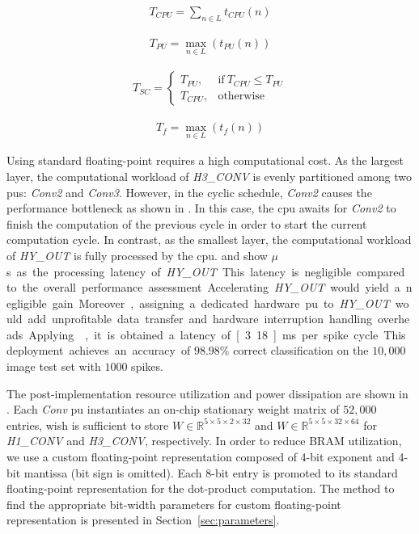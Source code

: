 \begin{eqnarray} \label{eq:time_cpu}
T_{CPU} = \sum_{n\in L} t_{CPU}(n)
\end{eqnarray}

\begin{eqnarray} \label{eq:time_pu}
T_{PU} = \max_{n\in L}(t_{PU}(n))
\end{eqnarray}

\begin{eqnarray} \label{eq:time_spike}
T_{SC} =
\begin{cases}
T_{PU}, & \text{if}\ T_{CPU}\le T_{PU} \\
T_{CPU}, & \text{otherwise}
\end{cases}
\end{eqnarray}

\begin{eqnarray} \label{eq:time_finish}
T_{f} = \max_{n\in L}(t_{f}(n))
\end{eqnarray}

Using standard floating-point requires a high computational cost. As the largest layer, the computational workload of \emph{H3\_CONV} is evenly partitioned among two \glspl{pu}: \emph{Conv2} and \emph{Conv3}. However, in the cyclic schedule, \emph{Conv2} causes the performance bottleneck as shown in . In this case, the \gls{cpu} awaits for \emph{Conv2} to finish the computation of the previous cycle in order to start the current computation cycle. In contrast, as the smallest layer, the computational workload of \emph{HY\_OUT} is fully processed by the \gls{cpu}.  and  show \unit[4]{$\mu$s} as the processing latency of \emph{HY\_OUT}. This latency is negligible compared to the overall performance assessment. Accelerating \emph{HY\_OUT} would yield a negligible gain. Moreover, assigning a dedicated hardware \gls{pu} to \emph{HY\_OUT} would add unprofitable data transfer and hardware interruption handling overheads.

Applying , it is obtained a latency of \unit[3.18]{ms} per spike cycle. This deployment achieves an accuracy of $98.98\%$ correct classification on the $10,000$ image test set with $1000$ spikes.

The post-implementation resource utilization and power dissipation are shown in . Each \emph{Conv} \gls{pu} instantiates an on-chip stationary weight matrix of $52,000$ entries, wish is sufficient to store $W\in\mathbb{R}^{5\times 5\times 2\times 32}$ and $W\in\mathbb{R}^{5\times 5\times 32\times 64}$ for \emph{H1\_CONV} and \emph{H3\_CONV}, respectively. In order to reduce BRAM utilization, we use a custom floating-point representation composed of 4-bit exponent and 4-bit mantissa (bit sign is omitted). Each 8-bit entry is promoted to its standard floating-point representation for the dot-product computation. The method to find the appropriate bit-width parameters for custom floating-point representation is presented in Section~\ref{sec:parameters}.

